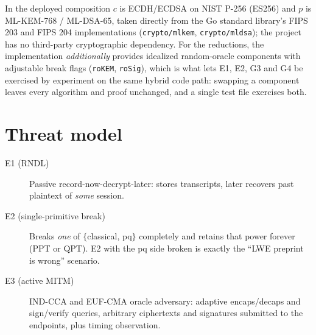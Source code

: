 \documentclass[11pt,a4paper]{article}
\theoremstyle{remark}
\begin{document}
In the deployed composition $c$ is ECDH/ECDSA on NIST P-256 (ES256) and $p$
is ML-KEM-768 / ML-DSA-65, taken directly from the Go standard library's FIPS
203 and FIPS 204 implementations (\texttt{crypto/mlkem}, \texttt{crypto/mldsa});
the project has no third-party cryptographic dependency. For the reductions,
the implementation \emph{additionally} provides idealized random-oracle
components with adjustable break flags (\texttt{roKEM}, \texttt{roSig}), which
is what lets E1, E2, G3 and G4 be exercised by experiment on the same hybrid
code path: swapping a component leaves every algorithm and proof unchanged,
and a single test file exercises both.

\section{Threat model}
\begin{description}
  \item[E1 (RNDL)] Passive record-now-decrypt-later: stores transcripts,
        later recovers past plaintext of \emph{some} session.
  \item[E2 (single-primitive break)] Breaks \emph{one} of
        $\{$classical, pq$\}$ completely and retains that power forever
        (PPT or QPT). E2 with the pq side broken is exactly the
        ``LWE preprint is wrong'' scenario.
  \item[E3 (active MITM)] IND-CCA and EUF-CMA oracle adversary: adaptive
        encaps/decaps and sign/verify queries, arbitrary ciphertexts and
        signatures submitted to the endpoints, plus timing observation.
\end{description}





\end{document}
